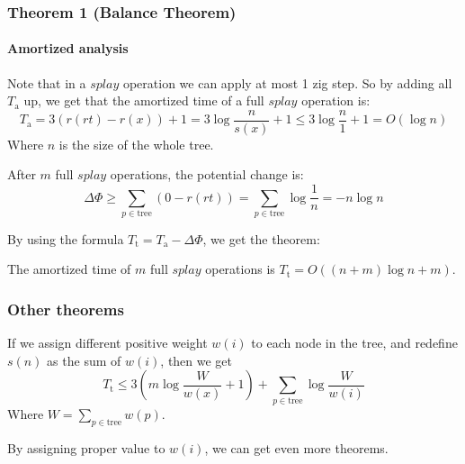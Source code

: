 \documentclass{beamer}
\theoremstyle{plain}
\begin{document}
    \begin{frame}
        \frametitle{Theorem 1 (Balance Theorem)}
        \framesubtitle{Amortized analysis}
    
        Note that in a $splay$ operation we can apply at most 1 zig step. So by adding all $T_\mathrm{a}$ up, we get that the amortized time of a full $splay$ operation is:
        \[T_\mathrm{a} = 3(r(rt) - r(x)) + 1 = 3 \log \frac{n}{s(x)} + 1 \leq 3\log \frac{n}{1} + 1 = O(\log n)\]
        Where $n$ is the size of the whole tree. \pause

        After $m$ full $splay$ operations, the potential change is:
        \[\Delta\varPhi \geq \sum_{p \in \text{tree}} (0 - r(rt)) = \sum_{p \in \text{tree}} \log \frac{1}{n} = -n\log n\] \pause

        By using the formula $T_\mathrm{t} = T_\mathrm{a} - \Delta\varPhi$, we get the theorem:

        \begin{theorem}
            The amortized time of $m$ full $splay$ operations is $T_\mathrm{t} = O((n + m)\log n + m)$.
        \end{theorem}
    
    \end{frame}

    \begin{frame}
        \frametitle{Other theorems}
    
        If we assign different positive weight $w(i)$ to each node in the tree, and redefine $s(n)$ as the sum of $w(i)$, then we get
        \[T_\mathrm{t} \leq 3(m \log \frac{W}{w(x)} + 1) + \sum_{p \in \text{tree}} \log \frac{W}{w(i)}\]
        Where $W = \sum_{p \in \text{tree}} w(p)$.

        By assigning proper value to $w(i)$, we can get even more theorems.
    
    \end{frame}
\end{document}
